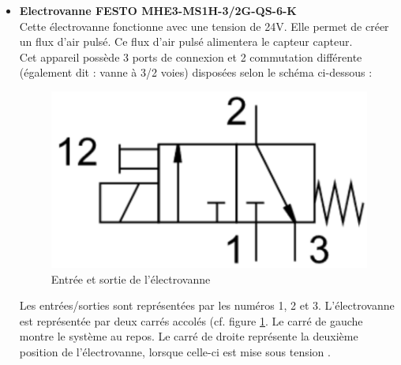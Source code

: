 \begin{itemize}
          Sur le figure \ref{fig:calibration}, nous pouvons observer la tension mesurée en fonction d'un certain débit d'air. Les paramètres utilisés
          pour cette calibration sont les suivants :
          \begin{itemize}
              \item Sortie analogique en tension sur une plage de 0V à 10V
              \item Full Scale allant de 0\% à +100\%
          \end{itemize}

          Le graphe montre une fonction linéaire qui se rapproche très fortement de la fonction $y = x$ (f$_{mesur\acute{e}}$(x) = 1.0004x - 0.0038).\\

    \item \textbf{Electrovanne FESTO MHE3-MS1H-3/2G-QS-6-K}\\
          Cette électrovanne fonctionne avec une tension de 24V.  Elle permet de créer un flux d'air pulsé. Ce flux d'air pulsé alimentera le
          capteur \gls{capteur}.\\
          Cet appareil possède 3 ports de connexion et 2 commutation différente (également dit : vanne à 3/2 voies) disposées selon le schéma ci-dessous :
          \begin{figure}[H]
              \centering
              \includegraphics[scale = 0.3]{assets/figures/Electrovanne_InOutput.png}
              \caption{Entrée et sortie de l'électrovanne}
              \label{fig:electrovanne_InOutput}
          \end{figure}
          Les entrées/sorties sont représentées par les numéros 1, 2 et 3. L'électrovanne est représentée par deux carrés accolés (cf. figure
          \ref*{fig:electrovanne_InOutput}. Le carré de gauche montre le système au repos. Le carré de droite représente la deuxième position de
          l'électrovanne, lorsque celle-ci est mise sous tension \cite{mimwebsite}.\\


\end{itemize}
